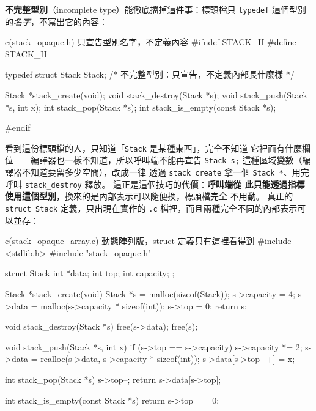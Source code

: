 \textbf{不完整型別}（incomplete type）能徹底擋掉這件事：標頭檔只
\texttt{typedef} 這個型別的\textit{名字}，不寫出它的內容：

\begin{example}{c}{(stack\_opaque.h) 只宣告型別名字，不定義內容}
#ifndef STACK_H
#define STACK_H

typedef struct Stack Stack; /* 不完整型別：只宣告，不定義內部長什麼樣 */

Stack *stack_create(void);
void   stack_destroy(Stack *s);
void   stack_push(Stack *s, int x);
int    stack_pop(Stack *s);
int    stack_is_empty(const Stack *s);

#endif
\end{example}

看到這份標頭檔的人，只知道「\texttt{Stack} 是某種東西」，完全不知道
它裡面有什麼欄位——編譯器也一樣不知道，所以呼叫端不能再宣告
\texttt{Stack s;} 這種區域變數（編譯器不知道要留多少空間），改成一律
透過 \texttt{stack\_create} 拿一個 \texttt{Stack *}、用完呼叫
\texttt{stack\_destroy} 釋放。 這正是這個技巧的代價：\textbf{呼叫端從
此只能透過指標使用這個型別}，換來的是內部表示可以隨便換，標頭檔完全
不用動。 真正的 \texttt{struct Stack} 定義，只出現在實作的 \texttt{.c}
檔裡，而且兩種完全不同的內部表示可以並存：

\begin{example}{c}{(stack\_opaque\_array.c) 動態陣列版，struct 定義只有這裡看得到}
#include <stdlib.h>
#include "stack_opaque.h"

struct Stack {
    int *data;
    int top;
    int capacity;
};

Stack *stack_create(void) {
    Stack *s = malloc(sizeof(Stack));
    s->capacity = 4;
    s->data = malloc(s->capacity * sizeof(int));
    s->top = 0;
    return s;
}

void stack_destroy(Stack *s) {
    free(s->data);
    free(s);
}

void stack_push(Stack *s, int x) {
    if (s->top == s->capacity) {
        s->capacity *= 2;
        s->data = realloc(s->data, s->capacity * sizeof(int));
    }
    s->data[s->top++] = x;
}

int stack_pop(Stack *s) {
    s->top--;
    return s->data[s->top];
}

int stack_is_empty(const Stack *s) { return s->top == 0; }
\end{example}

